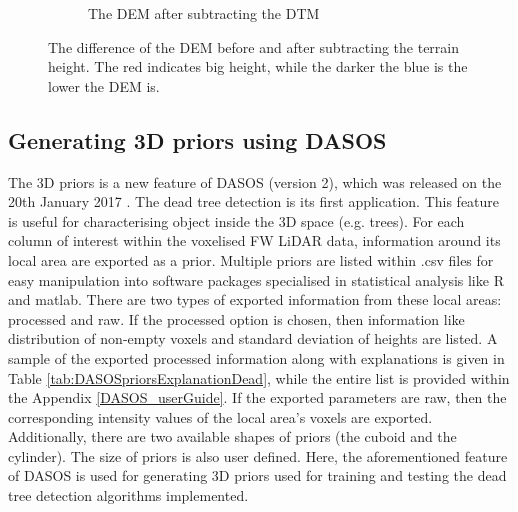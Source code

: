 \documentclass{subfiles}
\begin{document}
\begin{figure} [h!]
\begin{subfigure}[t]{.49\textwidth}
		\caption{The DEM after subtracting the DTM} 
		\label{fig:height_dtm}
	\end{subfigure} \hfill
	\caption[Before and after subtracting the DTM.]{The difference of the DEM before and after subtracting the terrain height. The  red indicates big height, while the darker the blue is the lower the DEM is.}  
	\label{fig:height_minus_dtm} 
\end{figure}


\subsection{Generating 3D priors using DASOS}\label{sec:3DpriorsGeneration}

\par The 3D priors is a new feature of DASOS (version 2), which was released on the 20th January 2017 \cite{DASOS_v2}. The dead tree detection is its first application. This feature is useful for characterising object inside the 3D space (e.g. trees). For each column of interest within the voxelised FW LiDAR data, information around its local area are exported as a prior. Multiple priors are listed within .csv files for easy manipulation into software packages specialised in statistical analysis like R and matlab. There are two types of exported information from these local areas: processed and raw. If the processed option is chosen, then information like distribution of non-empty voxels and standard deviation of heights are listed. A sample of the exported processed information along with explanations is given in Table \ref{tab:DASOSpriorsExplanationDead}, while the entire list is provided within the Appendix \ref{DASOS_userGuide}. If the exported parameters are raw, then the corresponding intensity values of the local area's voxels are exported. Additionally, there are two available shapes of priors (the cuboid and the cylinder). The size of priors is also user defined. Here, the aforementioned feature of DASOS is used for generating 3D priors used for training and testing the dead tree detection algorithms implemented.
\end{document}
